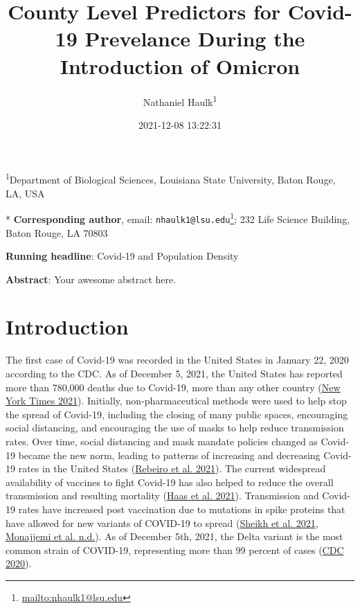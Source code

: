 \documentclass[
  12pt,
]{article}
\title{County Level Predictors for Covid-19 Prevelance During the Introduction of Omicron}
\author{Nathaniel Haulk\textsuperscript{1}}
\date{2021-12-08 13:22:31}
\DeclareRobustCommand{\href}[2]{#2\footnote{\url{#1}}}
\begin{document}
\maketitle

\renewcommand{\figurename}{{\textbf{Figure}}}
\renewcommand{\tablename}{{\textbf{Table}}}

\footnotesize

\textsuperscript{1}Department of Biological Sciences, Louisiana State University, Baton Rouge, LA, USA

* \textbf{Corresponding author}, email: \href{mailto:nhaulk1@lsu.edu}{\nolinkurl{nhaulk1@lsu.edu}}; 232 Life Science Building, Baton Rouge, LA 70803

\normalsize

\textbf{Running headline}: Covid-19 and Population Density

\textbf{Abstract}: Your awesome abstract here.

\clearpage

\hypertarget{introduction}{%
\section{Introduction}\label{introduction}}

The first case of Covid-19 was recorded in the United States in January 22, 2020 according to the CDC. As of December 5, 2021, the United States has reported more than 780,000 deaths due to Covid-19, more than any other country (\protect\hyperlink{ref-new_york_times_coronavirus_2021}{New York Times 2021}). Initially, non-pharmaceutical methods were used to help stop the spread of Covid-19, including the closing of many public spaces, encouraging social distancing, and encouraging the use of masks to help reduce transmission rates. Over time, social distancing and mask mandate policies changed as Covid-19 became the new norm, leading to patterns of increasing and decreasing Covid-19 rates in the United States (\protect\hyperlink{ref-rebeiro_impact_2021}{Rebeiro et al. 2021}). The current widespread availability of vaccines to fight Covid-19 has also helped to reduce the overall transmission and resulting mortality (\protect\hyperlink{ref-haas_infections_2021}{Haas et al. 2021}). Transmission and Covid-19 rates have increased post vaccination due to mutations in spike proteins that have allowed for new variants of COVID-19 to spread (\protect\hyperlink{ref-sheikh_sars-cov-2_2021}{Sheikh et al. 2021}, \protect\hyperlink{ref-monajjemi_delta_nodate}{Monajjemi et al. n.d.}). As of December 5th, 2021, the Delta variant is the most common strain of COVID-19, representing more than 99 percent of cases (\protect\hyperlink{ref-cdc_covid_2020}{CDC 2020}).
\end{document}
